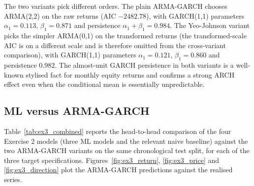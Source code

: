 \documentclass[12pt,a4paper]{article}
\newcommand{\probsub}[2]{\subsection{#2}}
\begin{document}
The two variants pick different orders. The plain ARMA-GARCH chooses ARMA(2,2) on the raw returns (AIC $-2482.78$), with GARCH(1,1) parameters $\alpha_1 = 0.113$, $\beta_1 = 0.871$ and persistence $\alpha_1 + \beta_1 = 0.984$. The Yeo-Johnson variant picks the simpler ARMA(0,1) on the transformed returns (the transformed-scale AIC is on a different scale and is therefore omitted from the cross-variant comparison), with GARCH(1,1) parameters $\alpha_1 = 0.121$, $\beta_1 = 0.860$ and persistence $0.982$. The almost-unit GARCH persistence in both variants is a well-known stylised fact for monthly equity returns and confirms a strong ARCH effect even when the conditional mean is essentially unpredictable.

\probsub{3b}{ML versus ARMA-GARCH}

Table~\ref{tab:ex3_combined} reports the head-to-head comparison of the four Exercise 2 models (three ML models and the relevant naive baseline) against the two ARMA-GARCH variants on the same chronological test split, for each of the three target specifications. Figures~\ref{fig:ex3_return}, \ref{fig:ex3_price} and \ref{fig:ex3_direction} plot the ARMA-GARCH predictions against the realised series.
\end{document}
